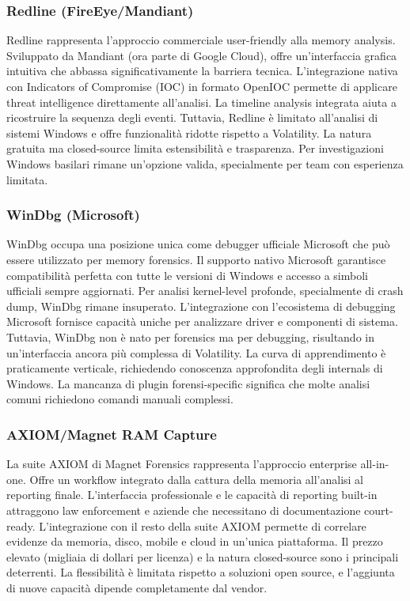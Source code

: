 \subsubsection{Redline (FireEye/Mandiant)}
Redline rappresenta l'approccio commerciale user-friendly alla memory analysis. Sviluppato da Mandiant (ora parte di Google Cloud), offre un'interfaccia grafica intuitiva che abbassa significativamente la barriera tecnica. L'integrazione nativa con Indicators of Compromise (IOC) in formato OpenIOC permette di applicare threat intelligence direttamente all'analisi. La timeline analysis integrata aiuta a ricostruire la sequenza degli eventi. Tuttavia, Redline è limitato all'analisi di sistemi Windows e offre funzionalità ridotte rispetto a Volatility. La natura gratuita ma closed-source limita estensibilità e trasparenza. Per investigazioni Windows basilari rimane un'opzione valida, specialmente per team con esperienza limitata.

\subsubsection{WinDbg (Microsoft)}
WinDbg occupa una posizione unica come debugger ufficiale Microsoft che può essere utilizzato per memory forensics. Il supporto nativo Microsoft garantisce compatibilità perfetta con tutte le versioni di Windows e accesso a simboli ufficiali sempre aggiornati. Per analisi kernel-level profonde, specialmente di crash dump, WinDbg rimane insuperato. L'integrazione con l'ecosistema di debugging Microsoft fornisce capacità uniche per analizzare driver e componenti di sistema. Tuttavia, WinDbg non è nato per forensics ma per debugging, risultando in un'interfaccia ancora più complessa di Volatility. La curva di apprendimento è praticamente verticale, richiedendo conoscenza approfondita degli internals di Windows. La mancanza di plugin forensi-specific significa che molte analisi comuni richiedono comandi manuali complessi.

\subsubsection{AXIOM/Magnet RAM Capture}
La suite AXIOM di Magnet Forensics rappresenta l'approccio enterprise all-in-one. Offre un workflow integrato dalla cattura della memoria all'analisi al reporting finale. L'interfaccia professionale e le capacità di reporting built-in attraggono law enforcement e aziende che necessitano di documentazione court-ready. L'integrazione con il resto della suite AXIOM permette di correlare evidenze da memoria, disco, mobile e cloud in un'unica piattaforma. Il prezzo elevato (migliaia di dollari per licenza) e la natura closed-source sono i principali deterrenti. La flessibilità è limitata rispetto a soluzioni open source, e l'aggiunta di nuove capacità dipende completamente dal vendor.

